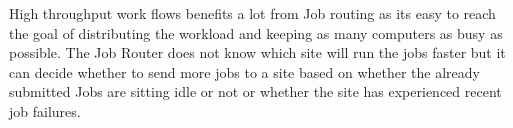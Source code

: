 \documentclass[ms,electronic,double]{nuthesis}
\begin{document}
High throughput work flows benefits a lot from Job routing as its easy to reach the goal of distributing the 
workload and keeping as many computers as busy as possible. The Job Router does not know which site
will run the jobs faster but it can decide whether to send more jobs to a site based on whether the already 
submitted Jobs are sitting idle or not or whether the site has experienced 
recent job failures.

\backmatter

\appendix




\nocite{*}

\end{document}
